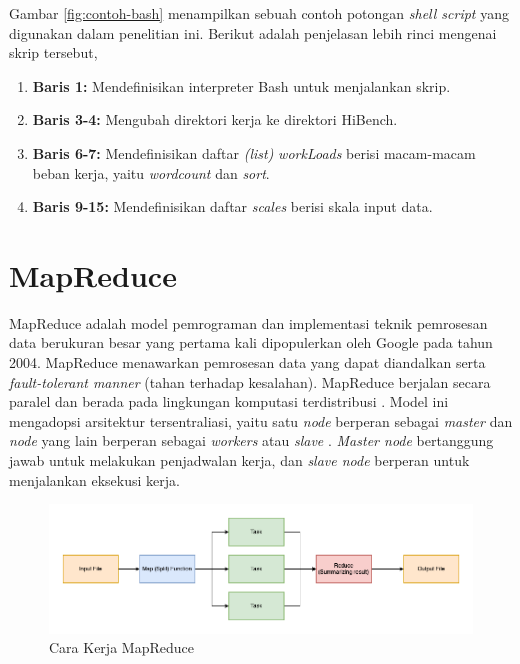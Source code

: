 Gambar \ref{fig:contoh-bash} menampilkan sebuah contoh potongan \textit{shell script} yang digunakan dalam penelitian ini. Berikut adalah penjelasan lebih rinci mengenai skrip tersebut,
\begin{enumerate}
    \item \textbf{Baris 1:} Mendefinisikan interpreter Bash untuk menjalankan skrip.
    \item \textbf{Baris 3-4: } Mengubah direktori kerja ke direktori HiBench.
    \item \textbf{Baris 6-7: } Mendefinisikan daftar \textit{(list)} \textit{workLoads} berisi macam-macam beban kerja, yaitu \textit{wordcount} dan \textit{sort}.
    \item \textbf{Baris 9-15: } Mendefinisikan daftar \textit{scales} berisi skala input data.
\end{enumerate}

\section{MapReduce}
MapReduce adalah model pemrograman dan implementasi teknik pemrosesan data berukuran besar yang pertama kali dipopulerkan oleh Google pada tahun 2004\cite{kaliaAnalysisHadoopMapReduce2021}. MapReduce menawarkan pemrosesan data yang dapat diandalkan serta \textit{fault-tolerant manner} (tahan terhadap kesalahan).  MapReduce berjalan secara paralel dan berada pada lingkungan komputasi terdistribusi \cite{cTaskFailureResilience2020}. Model ini mengadopsi arsitektur tersentraliasi, yaitu satu \textit{node} berperan sebagai \textit{master} dan \textit{node} yang lain berperan sebagai \textit{workers} atau \textit{slave} \cite{herodotouHadoopPerformanceModels2011, bakratsasHadoopMapReducePerformance2018}. \textit{Master node} bertanggung jawab untuk melakukan penjadwalan kerja, dan \textit{slave node} berperan untuk menjalankan eksekusi kerja. 

\begin{figure}[h!]
    \centering
    \includegraphics[width=1\textwidth]{figures/ch02/mapreduce-scheme.png}
    \caption{Cara Kerja MapReduce}
    \label{fig:mapreduce-flow}
\end{figure}

